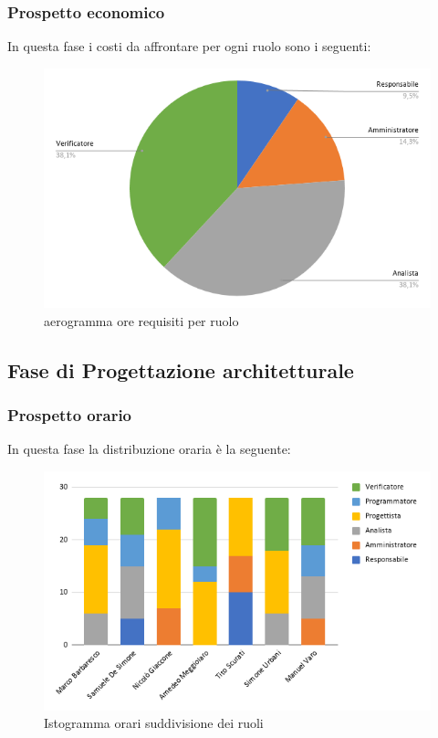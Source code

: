 \subsubsection{Prospetto economico}
In questa fase i costi da affrontare per ogni ruolo sono i seguenti:

\begin{figure}[!h]
    \caption{aerogramma ore requisiti per ruolo}
    \vspace{5px}
    \includegraphics[scale=0.5]{../../../Images/Diagrammi/Diagramma a torta/ore requisiti.png}
    \centering
\end{figure}



\subsection{Fase di Progettazione architetturale}
    \subsubsection{Prospetto orario}
    In questa fase la distribuzione oraria è la seguente:
    \begin{figure}[!h]
        \caption{Istogramma orari suddivisione dei ruoli}
        \vspace{5px}
        \includegraphics[scale=0.6]{../../../Images/Diagrammi/Istogrammi/ore architettura.png}
        \centering
    \end{figure}
